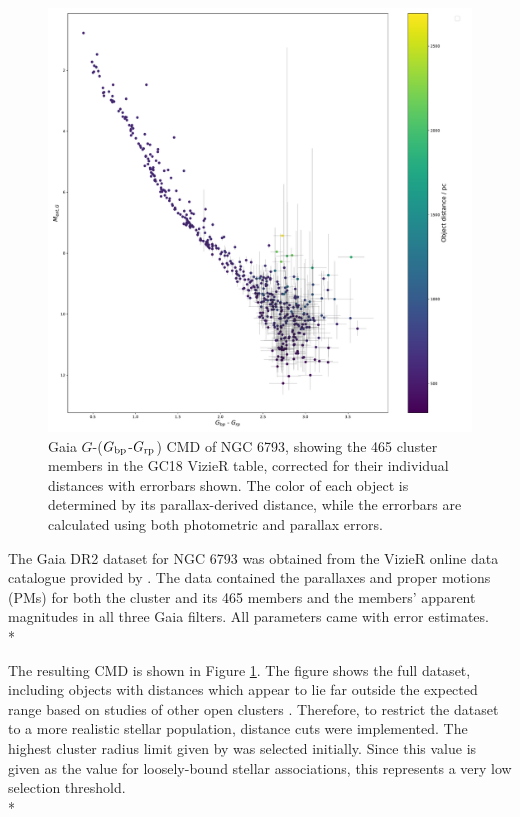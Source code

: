 \documentclass[12pt, a4paper]{report}
\begin{document}
\begin{figure}[h!]
\begin{center}
\includegraphics[width=1.0\textwidth]{../NGC_6793_CMD_observational_errorbars_vizier_465.pdf}
\caption{Gaia $G$-($G_{\textnormal{bp}}$-$G_{\textnormal{rp}}$) CMD of NGC 6793, showing the 465 cluster members in the GC18 VizieR table, corrected for their individual distances with errorbars shown. The color of each object is determined by its parallax-derived distance, while the errorbars are calculated using both photometric and parallax errors.}
\label{NGC_6793_obs_only_465}
\end{center}
\end{figure}

The Gaia DR2 dataset for NGC 6793 was obtained from the VizieR online data catalogue provided by \cite{2018A&A...616A..10G}. The data contained the parallaxes and proper motions (PMs) for both the cluster and its 465 members and the members' apparent magnitudes in all three Gaia filters. All parameters came with error estimates.\\*

The resulting CMD is shown in Figure \ref{NGC_6793_obs_only_465}. The figure shows the full dataset, including objects with distances which appear to lie far outside the expected range based on studies of other open clusters \citep{2006A&A...456..523S}. Therefore, to restrict the dataset to a more realistic stellar population, distance cuts were implemented. The highest cluster radius limit given by \cite{2006A&A...456..523S} was selected initially. Since this value is given as the value for loosely-bound stellar associations, this represents a very low selection threshold.\\*
\end{document}
